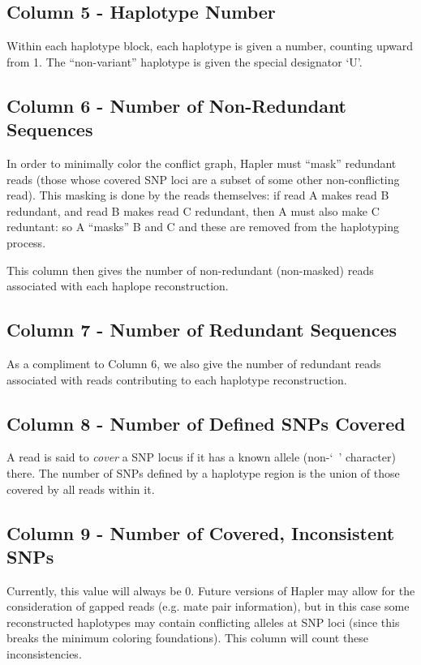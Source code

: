 \documentclass[11pt]{llncs}
\begin{document}
\subsection{Column 5 - Haplotype Number}

Within each haplotype block, each haplotype is given a number, counting upward from 1. The ``non-variant'' haplotype is given the special
designator `U'.

\subsection{Column 6 - Number of Non-Redundant Sequences}

In order to minimally color the conflict graph, Hapler must ``mask'' redundant reads (those whose covered SNP loci are a subset of some other 
non-conflicting read). This masking is done by the reads themselves: if read A makes read B redundant, and read B makes read C redundant,
then A must also make C reduntant: so A ``masks'' B and C and these are removed from the haplotyping process.

This column then gives the number of non-redundant (non-masked) reads associated with each haplope reconstruction.

\subsection{Column 7 - Number of Redundant Sequences}

As a compliment to Column 6, we also give the number of redundant reads associated with reads contributing to each haplotype reconstruction.

\subsection{Column 8 - Number of Defined SNPs Covered}

A read is said to \emph{cover} a SNP locus if it has a known allele (non-`~' character) there. The number of SNPs defined by a haplotype region
is the union of those covered by all reads within it.

\subsection{Column 9 - Number of Covered, Inconsistent SNPs}

Currently, this value will always be 0. Future versions of Hapler may allow for the consideration of gapped reads (e.g. mate pair information), but 
in this case some reconstructed haplotypes may contain conflicting alleles at SNP loci (since this breaks the minimum coloring foundations). This 
column will count these inconsistencies.
\end{document}
